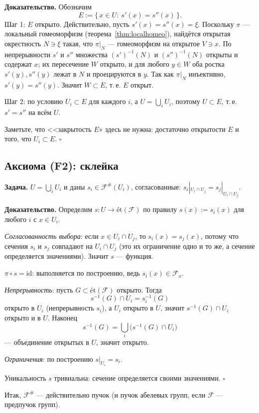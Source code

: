 \documentclass[11pt,b5paper]{article}
\newcommand{\et}{\text{ét}}
\newcommand{\id}{\mathrm{id}}
\newcommand{\Shv}[1]{\mathscr{#1}}   %
\theoremstyle{plain}
\theoremstyle{definition}
\theoremstyle{remark}
\let\brutsubsection\subsection
\renewcommand{\subsection}{\Needspace{5\baselineskip}\brutsubsection}
\begin{document}
\textbf{Доказательство.} Обозначим
\[
 E:=\{\,x\in U:\ s'(x)=s''(x)\,\}.
\]
Шаг 1: $E$ открыто. Действительно, пусть $s'(x)=s''(x)=\xi$. Поскольку
$\pi$ --- локальный гомеоморфизм (теорема~\ref{thm:localhomeo}), найдётся
открытая окрестность $N\ni\xi$ такая, что $\pi|_{N}$ --- гомеоморфизм
на открытое $V\ni x$. По непрерывности $s'$ и $s''$ множества
$(s')^{-1}(N)$ и $(s'')^{-1}(N)$ открыты и содержат $x$; их пересечение
$W$ открыто, и для любого $y\in W$ оба ростка $s'(y),s''(y)$ лежат в
$N$ и проецируются в $y$. Так как $\pi|_N$ инъективно,
$s'(y)=s''(y)$. Значит $W\subset E$, т.\,е. $E$ открыт.

Шаг 2: по условию $U_i\subset E$ для каждого $i$, а $U=\bigcup_iU_i$,
поэтому $U\subset E$, т.\,е. $s'=s''$ на всём $U$.

Заметьте, что <<закрытость $E$» здесь не нужна: достаточно открытости
$E$ и того, что $U_i\subset E$.
\hfill$\square$

\subsection{Аксиома (F2): склейка}
\textbf{Задача.} $U=\bigcup_iU_i$ и даны
$s_i\in\Shv{F}^{\#}(U_i)$, согласованные:
$s_i|_{U_i\cap U_j}=s_j|_{U_i\cap U_j}$.

\textbf{Доказательство.} Определим $s\colon U\to\et(\Shv{F})$ по правилу
$s(x):=s_i(x)$ для любого $i$ с $x\in U_i$.
\begin{conditions}
\item \emph{Согласованность выбора}: если $x\in U_i\cap U_j$, то
 $s_i(x)=s_j(x)$, потому что сечения $s_i$ и $s_j$ совпадают на
 $U_i\cap U_j$ (это их ограничение одно и то же, а сечение
 определяется значениями). Значит $s$ --- функция.
\item \emph{$\pi\circ s=\id$}: выполняется по построению, ведь
 $s_i(x)\in\Shv{F}_x$.
\item \emph{Непрерывность}: пусть $G\subset\et(\Shv{F})$ открыто. Тогда
 \[
   s^{-1}(G)\cap U_i=s_i^{-1}(G)
 \]
 открыто в $U_i$ (непрерывность $s_i$), а $U_i$ открыто в $U$,
 значит $s^{-1}(G)\cap U_i$ открыто и в $U$. Наконец
 \[
   s^{-1}(G)=\bigcup_i\bigl(s^{-1}(G)\cap U_i\bigr)
 \]
 --- объединение открытых в $U$, значит открыто.
\item \emph{Ограничения}: по построению $s|_{U_i}=s_i$.
\end{conditions}
Уникальность $s$ тривиальна: сечение определяется своими значениями.
\hfill$\square$

Итак, $\Shv{F}^{\#}$ --- действительно пучок (и пучок абелевых групп,
если $\Shv{F}$ --- предпучок групп).
\end{document}
